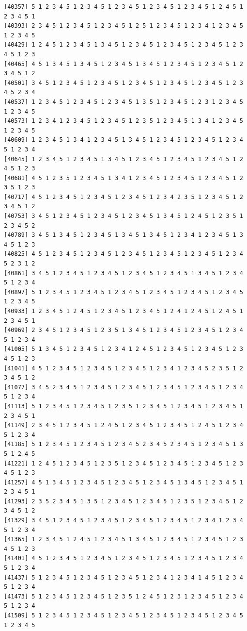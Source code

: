 \documentclass[
  english,
]{book}
\begin{document}
\begin{verbatim}
[40357] 5 1 2 3 4 5 1 2 3 4 5 1 2 3 4 5 1 2 3 4 5 1 2 3 4 5 1 2 4 5 1 2 3 4 5 1
[40393] 2 3 4 5 1 2 3 4 5 1 2 3 4 5 1 2 5 1 2 3 4 5 1 2 3 4 1 2 3 4 5 1 2 3 4 5
[40429] 1 2 4 5 1 2 3 4 5 1 3 4 5 1 2 3 4 5 1 2 3 4 5 1 2 3 4 5 1 2 3 4 5 1 2 3
[40465] 4 5 1 3 4 5 1 3 4 5 1 2 3 4 5 1 3 4 5 1 2 3 4 5 1 2 3 4 5 1 2 3 4 5 1 2
[40501] 3 4 5 1 2 3 4 5 1 2 3 4 5 1 2 3 4 5 1 2 3 4 5 1 2 3 4 5 1 2 3 4 5 2 3 4
[40537] 1 2 3 4 5 1 2 3 4 5 1 2 3 4 5 1 3 5 1 2 3 4 5 1 2 3 1 2 3 4 5 1 2 3 4 5
[40573] 1 2 3 4 1 2 3 4 5 1 2 3 4 5 1 2 3 5 1 2 3 4 5 1 3 4 1 2 3 4 5 1 2 3 4 5
[40609] 1 2 3 4 5 1 3 4 1 2 3 4 5 1 3 4 5 1 2 3 4 5 1 2 3 4 5 1 2 3 4 5 1 2 3 4
[40645] 1 2 3 4 5 1 2 3 4 5 1 3 4 5 1 2 3 4 5 1 2 3 4 5 1 2 3 4 5 1 2 4 5 1 2 3
[40681] 4 5 1 2 3 5 1 2 3 4 5 1 3 4 1 2 3 4 5 1 2 3 4 5 1 2 3 4 5 1 2 3 5 1 2 3
[40717] 4 5 1 2 3 4 5 1 2 3 4 5 1 2 3 4 5 1 2 3 4 2 3 5 1 2 3 4 5 1 2 3 4 5 1 2
[40753] 3 4 5 1 2 3 4 5 1 2 3 4 5 1 2 3 4 5 1 3 4 5 1 2 4 5 1 2 3 5 1 2 3 4 5 2
[40789] 3 4 5 1 3 4 5 1 2 3 4 5 1 3 4 5 1 3 4 5 1 2 3 4 1 2 3 4 5 1 3 4 5 1 2 3
[40825] 4 5 1 2 3 4 5 1 2 3 4 5 1 2 3 4 5 1 2 3 4 5 1 2 3 4 5 1 2 3 4 5 2 3 1 2
[40861] 3 4 5 1 2 3 4 5 1 2 3 4 5 1 2 3 4 5 1 2 3 4 5 1 3 4 5 1 2 3 4 5 1 2 3 4
[40897] 5 1 2 3 4 5 1 2 3 4 5 1 2 3 4 5 1 2 3 4 5 1 2 3 4 5 1 2 3 4 5 1 2 3 4 5
[40933] 1 2 3 4 5 1 2 4 5 1 2 3 4 5 1 2 3 4 5 1 2 4 1 2 4 5 1 2 4 5 1 2 3 4 5 1
[40969] 2 3 4 5 1 2 3 4 5 1 2 3 5 1 3 4 5 1 2 3 4 5 1 2 3 4 5 1 2 3 4 5 1 2 3 4
[41005] 5 1 3 4 5 1 2 3 4 5 1 2 3 4 1 2 4 5 1 2 3 4 5 1 2 3 4 5 1 2 3 4 5 1 2 3
[41041] 4 5 1 2 3 4 5 1 2 3 4 5 1 2 3 4 5 1 2 3 4 1 2 3 4 5 2 3 5 1 2 3 4 5 1 2
[41077] 3 4 5 2 3 4 5 1 2 3 4 5 1 2 3 4 5 1 2 3 4 5 1 2 3 4 5 1 2 3 4 5 1 2 3 4
[41113] 5 1 2 3 4 5 1 2 3 4 5 1 2 3 5 1 2 3 4 5 1 2 3 4 5 1 2 3 4 5 1 2 3 4 5 1
[41149] 2 3 4 5 1 2 3 4 5 1 2 4 5 1 2 3 4 5 1 2 3 4 5 1 2 4 5 1 2 3 4 5 1 2 3 4
[41185] 5 1 2 3 4 5 1 2 3 4 5 1 2 3 4 5 2 3 4 5 2 3 4 5 1 2 3 4 5 1 3 5 1 2 4 5
[41221] 1 2 4 5 1 2 3 4 5 1 2 3 5 1 2 3 4 5 1 2 3 4 5 1 2 3 4 5 1 2 3 4 5 1 2 3
[41257] 4 5 1 3 4 5 1 2 3 4 5 1 2 3 4 5 1 2 3 4 5 1 3 4 5 1 2 3 4 5 1 2 3 4 5 1
[41293] 2 3 5 2 3 4 5 1 3 5 1 2 3 4 5 1 2 3 4 5 1 2 3 5 1 2 3 4 5 1 2 3 4 5 1 2
[41329] 3 4 5 1 2 3 4 5 1 2 3 4 5 1 2 3 4 5 1 2 3 4 5 1 2 3 4 1 2 3 4 5 1 2 3 4
[41365] 1 2 3 4 5 1 2 4 5 1 2 3 4 5 1 3 4 5 1 2 3 4 5 1 2 3 4 5 1 2 3 4 5 1 2 3
[41401] 4 5 1 2 3 4 5 1 2 3 4 5 1 2 3 4 5 1 2 3 4 5 1 2 3 4 5 1 2 3 4 5 1 2 3 4
[41437] 5 1 2 3 4 5 1 2 3 4 5 1 2 3 4 5 1 2 3 4 1 2 3 4 1 4 5 1 2 3 4 5 1 2 3 4
[41473] 5 1 2 3 4 5 1 2 3 4 5 1 2 3 5 1 2 4 5 1 2 3 1 2 3 4 5 1 2 3 4 5 1 2 3 4
[41509] 5 1 2 3 4 5 1 2 3 4 5 1 2 3 4 5 1 2 3 4 5 1 2 3 4 5 1 2 3 4 5 1 2 3 4 5

\end{verbatim}
\end{document}
